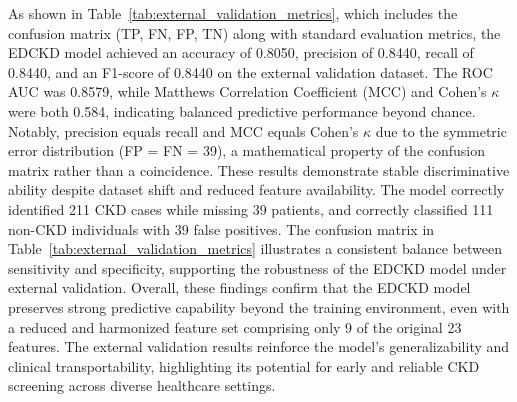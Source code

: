 As shown in Table~\ref{tab:external_validation_metrics}, which includes the confusion matrix (TP, FN, FP, TN) along with standard evaluation metrics, the EDCKD model achieved an accuracy of 0.8050, precision of 0.8440, recall of 0.8440, and an F1-score of 0.8440 on the external validation dataset. The ROC AUC was 0.8579, while Matthews Correlation Coefficient (MCC) and Cohen's $\kappa$ were both 0.584, indicating balanced predictive performance beyond chance. Notably, precision equals recall and MCC equals Cohen's $\kappa$ due to the symmetric error distribution (FP = FN = 39), a mathematical property of the confusion matrix rather than a coincidence. These results demonstrate stable discriminative ability despite dataset shift and reduced feature availability. The model correctly identified 211 CKD cases while missing 39 patients, and correctly classified 111 non-CKD individuals with 39 false positives. The confusion matrix in Table~\ref{tab:external_validation_metrics} illustrates a consistent balance between sensitivity and specificity, supporting the robustness of the EDCKD model under external validation. Overall, these findings confirm that the EDCKD model preserves strong predictive capability beyond the training environment, even with a reduced and harmonized feature set comprising only 9 of the original 23 features. The external validation results reinforce the model's generalizability and clinical transportability, highlighting its potential for early and reliable CKD screening across diverse healthcare settings.
